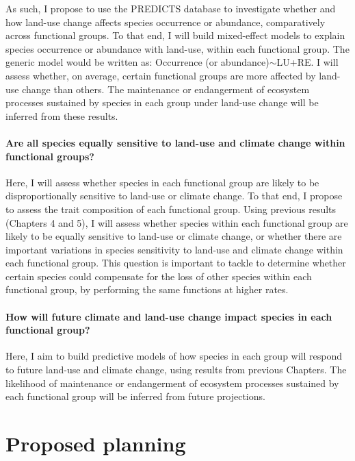 As such, I propose to use the PREDICTS database to investigate whether and how land-use change affects species occurrence or abundance, comparatively across functional groups. To that end, I will build mixed-effect models to explain species occurrence or abundance with land-use, within each functional group. The generic model would be written as: Occurrence (or abundance)$\sim$LU+RE. I will assess whether, on average, certain functional groups are more affected by land-use change than others. The maintenance or endangerment of ecosystem processes sustained by species in each group under land-use change will be inferred from these results.
 
\paragraph{Are all species equally sensitive to land-use and climate change within functional groups?}
Here, I will assess whether species in each functional group are likely to be disproportionally sensitive to land-use or climate change. To that end, I propose to assess the trait composition of each functional group. Using previous results (Chapters 4 and 5), I will assess whether species within each functional group are likely to be equally sensitive to land-use or climate change, or whether there are important variations in species sensitivity to land-use and climate change within each functional group. This question is important to tackle to determine whether certain species could compensate for the loss of other species within each functional group, by performing the same functions at higher rates. 

\paragraph{How will future climate and land-use change impact species in each functional group?}	
Here, I aim to build predictive models of how species in each group will respond to future land-use and climate change, using results from previous Chapters. The likelihood of maintenance or endangerment of ecosystem processes sustained by each functional group will be inferred from future projections. 

\section{Proposed planning}


